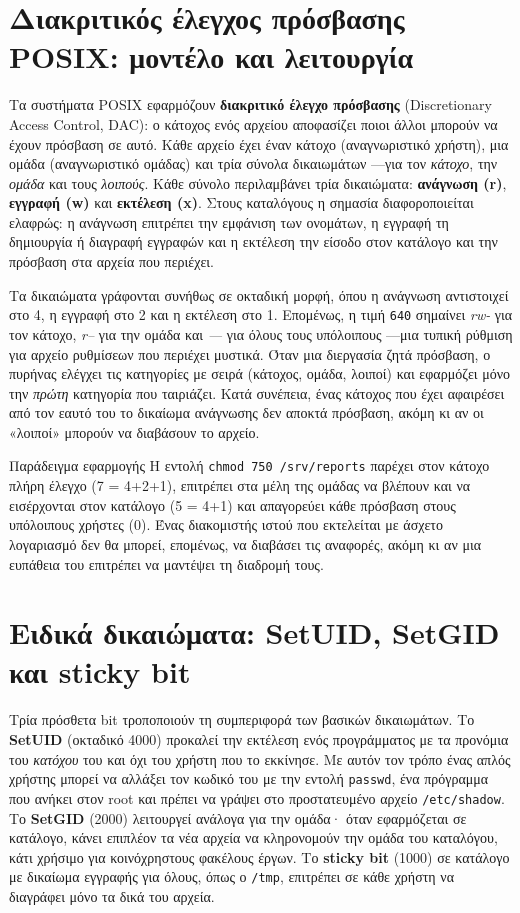 \section{Διακριτικός έλεγχος πρόσβασης POSIX: μοντέλο και λειτουργία}\label{sec:2.1}
Τα συστήματα POSIX εφαρμόζουν \textbf{διακριτικό έλεγχο πρόσβασης} (Discretionary Access Control, DAC): ο κάτοχος ενός αρχείου αποφασίζει ποιοι άλλοι μπορούν να έχουν πρόσβαση σε αυτό. Κάθε αρχείο έχει έναν κάτοχο (αναγνωριστικό χρήστη), μια ομάδα (αναγνωριστικό ομάδας) και τρία σύνολα δικαιωμάτων —για τον \emph{κάτοχο}, την \emph{ομάδα} και τους \emph{λοιπούς}. Κάθε σύνολο περιλαμβάνει τρία δικαιώματα: \textbf{ανάγνωση (r)}, \textbf{εγγραφή (w)} και \textbf{εκτέλεση (x)}. Στους καταλόγους η σημασία διαφοροποιείται ελαφρώς: η ανάγνωση επιτρέπει την εμφάνιση των ονομάτων, η εγγραφή τη δημιουργία ή διαγραφή εγγραφών και η εκτέλεση την είσοδο στον κατάλογο και την πρόσβαση στα αρχεία που περιέχει.

Τα δικαιώματα γράφονται συνήθως σε οκταδική μορφή, όπου η ανάγνωση αντιστοιχεί στο 4, η εγγραφή στο 2 και η εκτέλεση στο 1. Επομένως, η τιμή \texttt{640} σημαίνει \emph{rw-} για τον κάτοχο, \emph{r--} για την ομάδα και \emph{---} για όλους τους υπόλοιπους —μια τυπική ρύθμιση για αρχείο ρυθμίσεων που περιέχει μυστικά. Όταν μια διεργασία ζητά πρόσβαση, ο πυρήνας ελέγχει τις κατηγορίες με σειρά (κάτοχος, ομάδα, λοιποί) και εφαρμόζει μόνο την \emph{πρώτη} κατηγορία που ταιριάζει. Κατά συνέπεια, ένας κάτοχος που έχει αφαιρέσει από τον εαυτό του το δικαίωμα ανάγνωσης δεν αποκτά πρόσβαση, ακόμη κι αν οι «λοιποί» μπορούν να διαβάσουν το αρχείο.

\begin{examplebox}{Παράδειγμα εφαρμογής}
Η εντολή \texttt{chmod 750 /srv/reports} παρέχει στον κάτοχο πλήρη έλεγχο (7 = 4+2+1), επιτρέπει στα μέλη της ομάδας να βλέπουν και να εισέρχονται στον κατάλογο (5 = 4+1) και απαγορεύει κάθε πρόσβαση στους υπόλοιπους χρήστες (0). Ένας διακομιστής ιστού που εκτελείται με άσχετο λογαριασμό δεν θα μπορεί, επομένως, να διαβάσει τις αναφορές, ακόμη κι αν μια ευπάθεια του επιτρέπει να μαντέψει τη διαδρομή τους.
\end{examplebox}

\section{Ειδικά δικαιώματα: SetUID, SetGID και sticky bit}\label{sec:2.2}
Τρία πρόσθετα bit τροποποιούν τη συμπεριφορά των βασικών δικαιωμάτων. Το \textbf{SetUID} (οκταδικό 4000) προκαλεί την εκτέλεση ενός προγράμματος με τα προνόμια του \emph{κατόχου} του και όχι του χρήστη που το εκκίνησε. Με αυτόν τον τρόπο ένας απλός χρήστης μπορεί να αλλάξει τον κωδικό του με την εντολή \texttt{passwd}, ένα πρόγραμμα που ανήκει στον root και πρέπει να γράψει στο προστατευμένο αρχείο \texttt{/etc/shadow}. Το \textbf{SetGID} (2000) λειτουργεί ανάλογα για την ομάδα· όταν εφαρμόζεται σε κατάλογο, κάνει επιπλέον τα νέα αρχεία να κληρονομούν την ομάδα του καταλόγου, κάτι χρήσιμο για κοινόχρηστους φακέλους έργων. Το \textbf{sticky bit} (1000) σε κατάλογο με δικαίωμα εγγραφής για όλους, όπως ο \texttt{/tmp}, επιτρέπει σε κάθε χρήστη να διαγράφει μόνο τα δικά του αρχεία.

